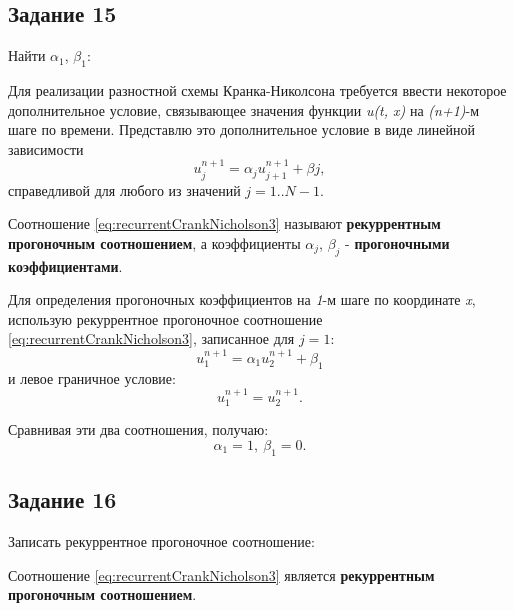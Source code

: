 \documentclass[12pt, a4paper]{report}
\begin{document}
	\subsection*{Задание 15}
	\large
	Найти $\alpha_1$, $\beta_1$: \par
	Для реализации разностной схемы Кранка-Николсона требуется ввести некоторое дополнительное условие, связывающее значения функции \textit{u(t, x)} на \textit{(n+1)}-м шаге по времени. Представлю это дополнительное условие в виде линейной зависимости
	\begin{equation}\label{eq:recurrentCrankNicholson3}
		u_{j}^{n+1} = \alpha_{j} u_{j+1}^{n+1} + \beta{j},
	\end{equation}
	справедливой для любого из значений $j=1..N-1$. \par
	Соотношение \eqref{eq:recurrentCrankNicholson3} называют \textbf{рекуррентным прогоночным соотношением}, а коэффициенты $\alpha_{j}$, $\beta_{j}$ - \textbf{прогоночными коэффициентами}. \\
	\par
	Для определения прогоночных коэффициентов на \textit{1}-м шаге по координате \textit{x}, использую рекуррентное прогоночное соотношение \eqref{eq:recurrentCrankNicholson3}, записанное для $j=1$:
	\begin{equation*}
		u_{1}^{n+1} = \alpha_{1} u_{2}^{n+1} + \beta_{1}
	\end{equation*}
	и левое граничное условие:
	\begin{equation*}
		u_{1}^{n+1} = u_{2}^{n+1}.
	\end{equation*}
	\par
	Сравнивая эти два соотношения, получаю:
	\begin{equation*}
		\alpha_{1} = 1, \> \beta_{1} = 0.
	\end{equation*}
	
	\subsection*{Задание 16}
	\large
	Записать рекуррентное прогоночное соотношение: \par
	Соотношение \eqref{eq:recurrentCrankNicholson3} является \textbf{рекуррентным прогоночным соотношением}.
		
\end{document}
